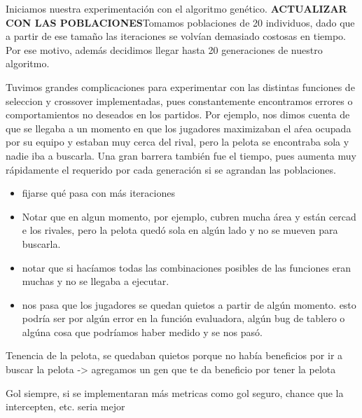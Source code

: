 Iniciamos nuestra experimentación con el algoritmo genético.
\textbf{ACTUALIZAR CON LAS POBLACIONES}Tomamos poblaciones de 20 individuos, dado que a partir de ese tamaño las iteraciones se volvían demasiado costosas en tiempo. Por ese motivo, además decidimos llegar hasta 20 generaciones de nuestro algoritmo.





Tuvimos grandes complicaciones para experimentar con las distintas funciones de seleccion y crossover implementadas, pues constantemente encontramos errores o comportamientos no deseados en los partidos.
Por ejemplo, nos dimos cuenta de que se llegaba a un momento en que los jugadores maximizaban el aŕea ocupada por su equipo y estaban muy cerca del rival, pero la pelota se encontraba sola y nadie iba a buscarla. Una gran barrera también fue el tiempo, pues aumenta muy rápidamente el requerido por cada generación si se agrandan las poblaciones.








\begin{itemize}
    \item fijarse qué pasa con más iteraciones
    \item Notar que en algun momento, por ejemplo, cubren mucha área y están cercad e los rivales, pero la pelota quedó sola en algún lado y no se mueven para buscarla.
    \item notar que si hacíamos todas las combinaciones posibles de las funciones eran muchas y no se llegaba a ejecutar.
    \item nos pasa que los jugadores se quedan quietos a partir de algún momento. esto podría ser por algún error en la función evaluadora, algún bug de tablero o algúna cosa que podríamos haber medido y se nos pasó.
\end{itemize}

Tenencia de la pelota, se quedaban quietos porque no había beneficios por ir a buscar la pelota -> agregamos un gen que te da beneficio por tener la pelota

Gol siempre, si se implementaran más metricas como gol seguro, chance que la intercepten, etc. seria mejor


